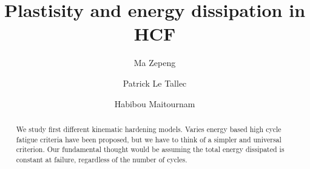 \documentclass[3p,times,procedia,number]{elsarticle}
\begin{document}
\begin{frontmatter}




\title{Plastisity and energy dissipation in HCF}




\author[a]{Ma Zepeng}
\author[b]{Patrick Le Tallec}
\author[c]{Habibou Maitournam}

\address[a]{Laboratory of Solid Mechanics, Ecole Polytechnique, 91128 Palaiseau Cedex, France}
\address[b]{Laboratory of Solid Mechanics, Ecole Polytechnique, 91128 Palaiseau Cedex, France}
\address[c]{Department of Mechanical Engineering, ENSTA ParisTech, 91128 Palaiseau Cedex, France}

\begin{abstract}
We study first  different kinematic hardening models. Varies energy based high cycle fatigue criteria have been proposed, but we have to think of a simpler and universal criterion. Our fundamental thought would be assuming the total energy dissipated is constant at failure, regardless of the number of cycles.
 
\end{abstract}


\end{frontmatter}
\end{document}
